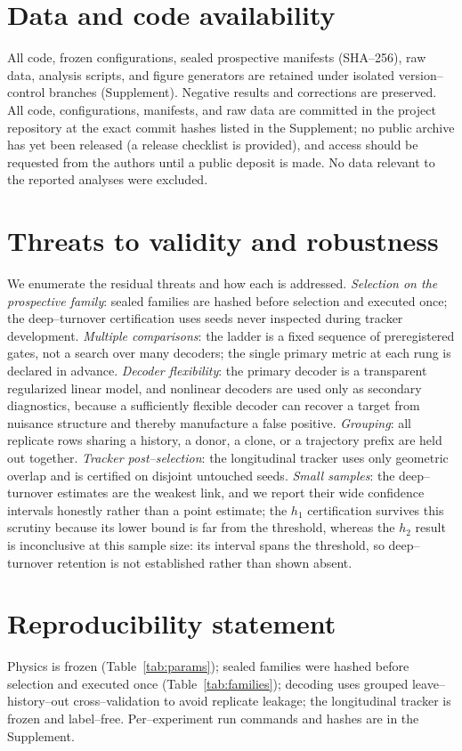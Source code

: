 \documentclass[11pt]{article}
\begin{document}
\section*{Data and code availability}
All code, frozen configurations, sealed prospective manifests (SHA--256), raw data, analysis scripts, and figure
generators are retained under isolated version--control branches (Supplement). Negative results and corrections are
preserved. All code, configurations, manifests, and raw data are committed in the project repository at the exact commit hashes listed in the Supplement; no public archive has yet been released (a release checklist is provided), and access should be requested from the authors until a public deposit is made. No data relevant to the reported analyses were excluded.

\section*{Threats to validity and robustness}
We enumerate the residual threats and how each is addressed. \emph{Selection on the prospective family}: sealed
families are hashed before selection and executed once; the deep--turnover certification uses seeds never inspected
during tracker development. \emph{Multiple comparisons}: the ladder is a fixed sequence of preregistered gates, not
a search over many decoders; the single primary metric at each rung is declared in advance. \emph{Decoder
flexibility}: the primary decoder is a transparent regularized linear model, and nonlinear decoders are used only as
secondary diagnostics, because a sufficiently flexible decoder can recover a target from nuisance structure and
thereby manufacture a false positive. \emph{Grouping}: all replicate rows sharing a history, a donor, a clone, or a
trajectory prefix are held out together. \emph{Tracker post--selection}: the longitudinal tracker uses only
geometric overlap and is certified on disjoint untouched seeds. \emph{Small samples}: the deep--turnover estimates
are the weakest link, and we report their wide confidence intervals honestly rather than a point estimate; the
$h_1$ certification survives this scrutiny because its lower bound is far from the threshold, whereas the $h_2$ result is inconclusive at this sample size: its interval spans the threshold, so deep--turnover retention is not established rather than shown absent.

\section*{Reproducibility statement}
Physics is frozen (Table~\ref{tab:params}); sealed families were hashed before selection and executed once
(Table~\ref{tab:families}); decoding uses grouped leave--history--out cross--validation to avoid replicate leakage;
the longitudinal tracker is frozen and label--free. Per--experiment run commands and hashes are in the Supplement.



\end{document}
